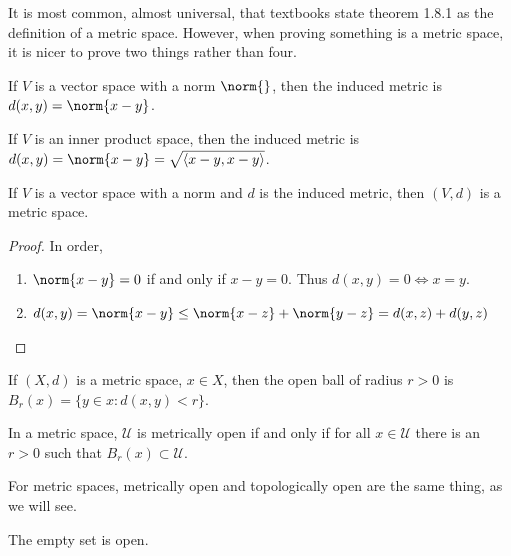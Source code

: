 \documentclass[crop=false,class=book,oneside]{standalone}
\begin{document}
            \begin{remark}
            It is most common, almost universal, that textbooks state theorem 1.8.1 as the definition of a metric space. However, when proving something is a metric space, it is nicer to prove two things rather than four.
            \end{remark}
            \begin{definition}
            If $V$ is a vector space with a norm $\norm{}$, then the induced metric is $d(x,y) = \norm{x-y}$.
            \end{definition}
            \begin{remark}
            If $V$ is an inner product space, then the induced metric is $d(x,y) = \norm{x-y} = \sqrt{\langle x-y,x-y\rangle }$.
            \end{remark}
            \begin{theorem}
            If $V$ is a vector space with a norm and $d$ is the induced metric, then $(V,d)$ is a metric space.
            \end{theorem}
            \begin{proof}
            In order,
            \begin{enumerate}
            \item $\norm{x-y} = 0$ if and only if $x-y = 0$. Thus $d(x,y) = 0 \Leftrightarrow x=y$.
            \item $d(x,y) = \norm{x-y}\leq \norm{x-z}+\norm{y-z} = d(x,z)+d(y,z)$
            \end{enumerate}
            \end{proof}
            \begin{definition}
            If $(X,d)$ is a metric space, $x\in X$, then the open ball of radius $r>0$ is $B_{r}(x) = \{y\in x: d(x,y)<r\}$.
            \end{definition}
            \begin{definition}
            In a metric space, $\mathcal{U}$ is metrically open if and only if for all $x\in \mathcal{U}$ there is an $r>0$ such that $B_{r}(x)\subset \mathcal{U}$.
            \end{definition}
            \begin{remark}
            For metric spaces, metrically open and topologically open are the same thing, as we will see.
            \end{remark} 
            \begin{theorem}
            The empty set is open.
            \end{theorem}
\end{document}
